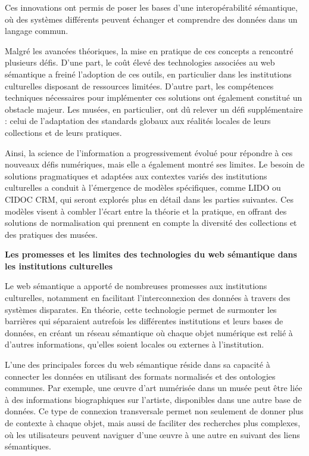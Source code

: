Ces innovations ont permis de poser les bases d’une interopérabilité sémantique, où des systèmes différents peuvent échanger et comprendre des données dans un langage commun.\newline

Malgré les avancées théoriques, la mise en pratique de ces concepts a rencontré plusieurs défis. D’une part, le coût élevé des technologies associées au web sémantique a freiné l’adoption de ces outils, en particulier dans les institutions culturelles disposant de ressources limitées. D’autre part, les compétences techniques nécessaires pour implémenter ces solutions ont également constitué un obstacle majeur. Les musées, en particulier, ont dû relever un défi supplémentaire : celui de l’adaptation des standards globaux aux réalités locales de leurs collections et de leurs pratiques. \newline

Ainsi, la science de l’information a progressivement évolué pour répondre à ces nouveaux défis numériques, mais elle a également montré ses limites. Le besoin de solutions pragmatiques et adaptées aux contextes variés des institutions culturelles a conduit à l’émergence de modèles spécifiques, comme LIDO ou CIDOC CRM, qui seront explorés plus en détail dans les parties suivantes. Ces modèles visent à combler l’écart entre la théorie et la pratique, en offrant des solutions de normalisation qui prennent en compte la diversité des collections et des pratiques des musées.\newline

\textbf{Les promesses et les limites des technologies du web sémantique dans les institutions culturelles}\newline

Le web sémantique a apporté de nombreuses promesses aux institutions culturelles, notamment en facilitant l’interconnexion des données à travers des systèmes disparates. En théorie, cette technologie permet de surmonter les barrières qui séparaient autrefois les différentes institutions et leurs bases de données, en créant un réseau sémantique où chaque objet numérique est relié à d’autres informations, qu’elles soient locales ou externes à l’institution.\newline

L’une des principales forces du web sémantique réside dans sa capacité à connecter les données en utilisant des formats normalisés et des ontologies communes. Par exemple, une œuvre d’art numérisée dans un musée peut être liée à des informations biographiques sur l’artiste, disponibles dans une autre base de données. Ce type de connexion transversale permet non seulement de donner plus de contexte à chaque objet, mais aussi de faciliter des recherches plus complexes, où les utilisateurs peuvent naviguer d’une œuvre à une autre en suivant des liens sémantiques.\newline

